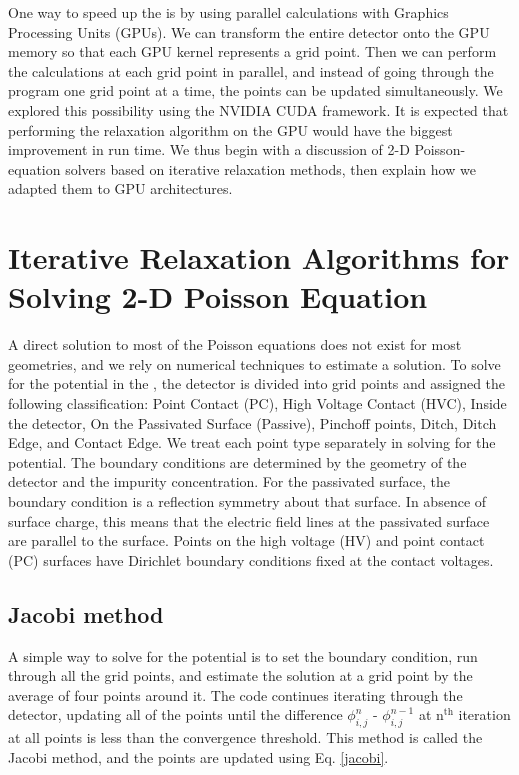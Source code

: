 One way to speed up the {\ehd} is by using parallel calculations with Graphics Processing Units (GPUs). We can transform the entire detector onto the GPU memory so that each GPU kernel represents a grid point. Then we can perform the calculations at each grid point in parallel, and instead of going through the program one grid point at a time, the points can be updated simultaneously. We explored this possibility using the NVIDIA CUDA {\cpp} framework. It is expected that performing the relaxation algorithm on the GPU would have the biggest improvement in run time. We thus begin with a discussion of 2-D Poisson-equation solvers based on iterative relaxation methods, then explain how we adapted them to GPU architectures.

\section{Iterative Relaxation Algorithms for Solving 2-D Poisson Equation}

A direct solution to most of the Poisson equations does not exist for most geometries, and we rely on numerical techniques to estimate a solution. To solve for the potential in the {\ehd}, the detector is divided into grid points and assigned the following classification: Point Contact (PC), High Voltage Contact (HVC), Inside the detector, On the Passivated Surface (Passive), Pinchoff points, Ditch, Ditch Edge, and Contact Edge. We treat each point type separately in solving for the potential. The boundary conditions are determined by the geometry of the detector and the impurity concentration. For the passivated surface, the boundary condition is a reflection symmetry about that surface. In absence of surface charge, this means that the electric field lines at the passivated surface are parallel to the surface. Points on the high voltage (HV) and point contact (PC) surfaces have Dirichlet boundary conditions fixed at the contact voltages.

\subsection*{Jacobi method}
A simple way to solve for the potential is to set the boundary condition, run through all the grid points, and estimate the solution at a grid point by the average of four points around it. The code continues iterating through the detector, updating all of the points until the difference $\phi_{i,j}^{n}$ - $\phi_{i,j}^{n-1}$ at n$^{\text{th}}$ iteration at all points is less than the convergence threshold. This method is called the Jacobi method, and the points are updated using Eq. \ref{jacobi}.


